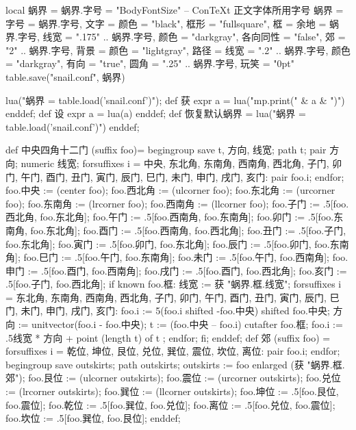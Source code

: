 \startluacode
local 蜗界 = {}
蜗界.字号 = "BodyFontSize" -- ConTeXt 正文字体所用字号
蜗界 = {
    字号 = 蜗界.字号,
    文字 = {颜色 = "black"},
    框形 = "fullsquare",
    框 = {余地 = 蜗界.字号, 
          线宽 = ".175" .. 蜗界.字号, 
          颜色 = "darkgray",
          各向同性 = "false",
          郊 = "2" .. 蜗界.字号},
    背景 = {颜色 = "lightgray"},
    路径 = {线宽 = ".2" .. 蜗界.字号,
            颜色 = "darkgray",
            有向 = "true",
            圆角 = ".25" .. 蜗界.字号},
    玩笑 = "0pt"
}
table.save("snail.conf", 蜗界)
\stopluacode

\startMPinclusions
lua("蜗界 = table.load('snail.conf')");
def 获 expr a = lua("mp.print(" & a & ")") enddef;
def 设 expr a = lua(a) enddef;
def 恢复默认蜗界 =
  lua("蜗界 = table.load('snail.conf')")
enddef;
\stopMPinclusions

\startMPinclusions[+]
def 中央四角十二门 (suffix foo)= 
  begingroup
  save t, 方向, 线宽; path t; pair 方向; numeric 线宽;
  forsuffixes i = 中央, 东北角, 东南角, 西南角, 西北角,
                  子门, 卯门, 午门, 酉门,
                  丑门, 寅门, 辰门, 巳门, 未门, 申门, 戌门, 亥门:
    pair foo.i;
  endfor;
  foo.中央 := (center foo);
  foo.西北角 := (ulcorner foo); 
  foo.东北角 := (urcorner foo);
  foo.东南角 := (lrcorner foo);
  foo.西南角 := (llcorner foo);
  foo.子门 := .5[foo.西北角, foo.东北角];
  foo.午门 := .5[foo.西南角, foo.东南角];
  foo.卯门 := .5[foo.东南角, foo.东北角];
  foo.酉门 := .5[foo.西南角, foo.西北角];
  foo.丑门 := .5[foo.子门, foo.东北角];
  foo.寅门 := .5[foo.卯门, foo.东北角];
  foo.辰门 := .5[foo.卯门, foo.东南角];
  foo.巳门 := .5[foo.午门, foo.东南角];
  foo.未门 := .5[foo.午门, foo.西南角];
  foo.申门 := .5[foo.酉门, foo.西南角];
  foo.戌门 := .5[foo.酉门, foo.西北角];
  foo.亥门 := .5[foo.子门, foo.西北角];
  if known foo.框:
    线宽 := 获 "蜗界.框.线宽";
    forsuffixes i = 东北角, 东南角, 西南角, 西北角,
                    子门, 卯门, 午门, 酉门,
                    丑门, 寅门, 辰门, 巳门, 未门, 申门, 戌门, 亥门:
      foo.i := 5(foo.i shifted -foo.中央) shifted foo.中央;
      方向 := unitvector(foo.i - foo.中央);
      t := (foo.中央 -- foo.i) cutafter foo.框;
      foo.i := .5线宽 * 方向 + point (length t) of t ;
    endfor;
  fi;
enddef;
def 郊 (suffix foo) = 
  forsuffixes i = 乾位, 坤位, 艮位, 兑位, 巽位, 震位, 坎位, 离位:
    pair foo.i;
  endfor;
  begingroup
    save outskirts; path outskirts;
  outskirts := foo enlarged (获 "蜗界.框.郊");
  foo.艮位 := (ulcorner outskirts); 
  foo.震位 := (urcorner outskirts);
  foo.兑位 := (lrcorner outskirts);
  foo.巽位 := (llcorner outskirts);
  foo.坤位 := .5[foo.艮位, foo.震位];
  foo.乾位 := .5[foo.巽位, foo.兑位];
  foo.离位 := .5[foo.兑位, foo.震位];
  foo.坎位 := .5[foo.巽位, foo.艮位];
enddef;

